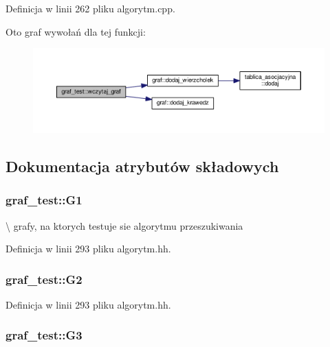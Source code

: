 Definicja w linii 262 pliku algorytm.\-cpp.



Oto graf wywołań dla tej funkcji\-:\nopagebreak
\begin{figure}[H]
\begin{center}
\leavevmode
\includegraphics[width=350pt]{classgraf__test_aeff6fe08c72fe45a15bd7b41028acc7c_cgraph}
\end{center}
\end{figure}




\subsection{Dokumentacja atrybutów składowych}
\hypertarget{classgraf__test_ad381752b1793a26f024d7083acc686b7}{
\subsubsection[{G1}]{ graf\-\_\-test\-::\-G1\hspace{0.3cm}{\ttfamily [private]}}}\label{classgraf__test_ad381752b1793a26f024d7083acc686b7}
\textbackslash{} grafy, na ktorych testuje sie algorytmu przeszukiwania 

Definicja w linii 293 pliku algorytm.\-hh.

\hypertarget{classgraf__test_a2da908ecaa7b052598d842ffd6c366a9}{
\subsubsection[{G2}]{ graf\-\_\-test\-::\-G2\hspace{0.3cm}{\ttfamily [private]}}}\label{classgraf__test_a2da908ecaa7b052598d842ffd6c366a9}


Definicja w linii 293 pliku algorytm.\-hh.

\hypertarget{classgraf__test_aaa19fc1426adf89a109e8679b92ee076}{
\subsubsection[{G3}]{ graf\-\_\-test\-::\-G3\hspace{0.3cm}{\ttfamily [private]}}}\label{classgraf__test_aaa19fc1426adf89a109e8679b92ee076}


